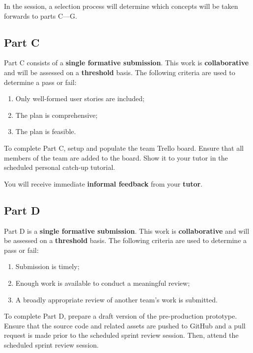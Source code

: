 \documentclass{../fal_assignment}
\begin{document}
In the session, a selection process will determine which concepts will be taken forwards to parts C---G.

\subsection*{Part C}

Part C consists of a \textbf{single formative submission}. This work is \textbf{collaborative} and will be assessed on a \textbf{threshold} basis. The following criteria are used to determine a pass or fail:

\begin{enumerate}[label=(\alph*)]
	\item Only well-formed user stories are included;
	\item The plan is comprehensive;
	\item The plan is feasible.
\end{enumerate}

To complete Part C, setup and populate the team Trello board. Ensure that all members of the team are added to the board. Show it to your tutor in the scheduled personal catch-up tutorial.

You will receive immediate \textbf{informal feedback} from your \textbf{tutor}.

\subsection*{Part D}

Part D is a \textbf{single formative submission}. This work is \textbf{collaborative} and will be assessed on a \textbf{threshold} basis. The following criteria are used to determine a pass or fail:

\begin{enumerate}[label=(\alph*)]
	\item Submission is timely;
	\item Enough work is available to conduct a meaningful review;
	\item A broadly appropriate review of another team's work is submitted.
\end{enumerate}

To complete Part D, prepare a draft version of the pre-production prototype. Ensure that the source code and related assets are pushed to GitHub and a pull request is made prior to the scheduled sprint review session. Then, attend the scheduled sprint review session.
\end{document}

